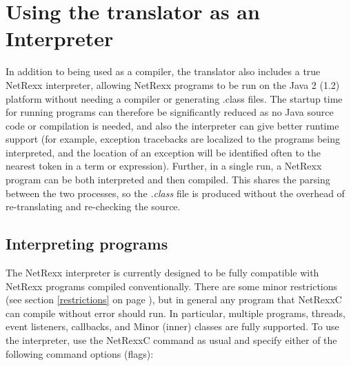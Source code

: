 \section{Using the translator as an Interpreter}
In addition to being used as a compiler, the translator also includes a
true NetRexx interpreter, allowing NetRexx programs to be run on the
Java 2 (1.2) platform without needing a compiler or generating .class
files.
\newline
The startup time for running programs can therefore be significantly
reduced as no Java source code or compilation is needed, and also the
interpreter can give better runtime support (for example, exception
tracebacks are localized to the programs being interpreted, and the
location of an exception will be identified often to the nearest token
in a term or expression).
\newline
Further, in a single run, a NetRexx program can be both interpreted and
then compiled.  This shares the parsing between the two processes, so
the \emph{.class} file is produced without the overhead of
re-translating and re-checking the source.

\subsection{Interpreting programs}
The NetRexx interpreter is currently designed to be fully compatible
with NetRexx programs compiled conventionally.  There are some minor
restrictions (see section \ref{restrictions} on page \pageref{restrictions}), but in general any program that NetRexxC
can compile without error should run.  In particular, multiple programs,
threads, event listeners, callbacks, and Minor (inner) classes are fully
supported.
\newline
To use the interpreter, use the NetRexxC command as usual and specify
either of the following command options (flags):

